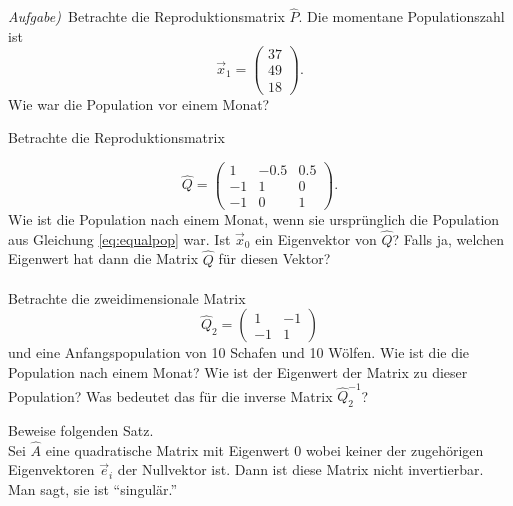    \emph{Aufgabe)}\ Betrachte die Reproduktionsmatrix $\hat P$. Die
   momentane Populationszahl ist 
   \begin{equation}
       \vec x_1 = \left(\begin{matrix}
               37\\
               49\\
               18
           \end{matrix}\right).
   \end{equation}
   Wie war die Population vor einem Monat?

 \subexercise[%
     topic={Eigenpopulationen},
    ]

    Betrachte die Reproduktionsmatrix 

  \begin{equation}
      \hat Q = 
      \left(
      \begin{matrix}
          1    & -0.5   & 0.5 \\
          -1  & 1 & 0 \\
          -1  & 0   & 1 
      \end{matrix}
  \right).
   \end{equation}
   Wie ist die Population nach einem Monat, wenn sie urspr\"unglich die
   Population aus Gleichung \ref{eq:equalpop} war. Ist $\vec x_0$ ein
   Eigenvektor von $\hat Q$? Falls ja, welchen Eigenwert hat dann die
   Matrix $\hat Q$ f\"ur diesen Vektor?\\\ \\
   Betrachte die zweidimensionale Matrix
  \begin{equation}
      \hat Q_2 = 
      \left(
      \begin{matrix}
          1    & -1 \\
          -1  & 1
      \end{matrix}
  \right)
   \end{equation}
   und eine Anfangspopulation von 10 Schafen und 10 W\"olfen. Wie ist
   die die Population nach einem Monat? Wie ist der Eigenwert der Matrix
   zu dieser Population? Was bedeutet das f\"ur die inverse Matrix $\hat
   Q_2^{-1}$?
   
    \subexercise[%
     topic={Inverse eine singul\"aren Matrix},
    ]
    Beweise folgenden Satz.\ \\

    Sei $\hat A$ eine quadratische Matrix mit Eigenwert 0 wobei keiner
    der
    zugeh\"origen Eigenvektoren $\vec e_i$ der Nullvektor ist.
    Dann ist diese Matrix nicht invertierbar. Man sagt, sie ist
    ``singul\"ar.''


